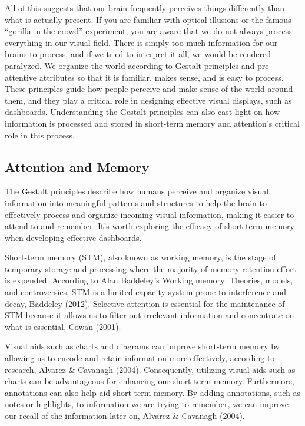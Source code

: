 \documentclass[print]{nuthesis}
\begin{document}
All of this suggests that our brain frequently perceives things differently than what is actually present.
If you are familiar with optical illusions or the famous ``gorilla in the crowd'' experiment, you are aware that we do not always process everything in our visual field.
There is simply too much information for our brains to process, and if we tried to interpret it all, we would be rendered paralyzed.
We organize the world according to Gestalt principles and pre-attentive attributes so that it is familiar, makes sense, and is easy to process.
These principles guide how people perceive and make sense of the world around them, and they play a critical role in designing effective visual displays, such as dashboards.
Understanding the Gestalt principles can also cast light on how information is processed and stored in short-term memory and attention's critical role in this process.

\hypertarget{attention-and-memory}{%
\subsection{Attention and Memory}\label{attention-and-memory}}

The Gestalt principles describe how humans perceive and organize visual information into meaningful patterns and structures to help the brain to effectively process and organize incoming visual information, making it easier to attend to and remember.
It's worth exploring the efficacy of short-term memory when developing effective dashboards.

Short-term memory (STM), also known as working memory, is the stage of temporary storage and processing where the majority of memory retention effort is expended.
According to Alan Baddeley's Working memory: Theories, models, and controversies, STM is a limited-capacity system prone to interference and decay, Baddeley (2012).
Selective attention is essential for the maintenance of STM because it allows us to filter out irrelevant information and concentrate on what is essential, Cowan (2001).

Visual aids such as charts and diagrams can improve short-term memory by allowing us to encode and retain information more effectively, according to research, Alvarez \& Cavanagh (2004).
Consequently, utilizing visual aids such as charts can be advantageous for enhancing our short-term memory.
Furthermore, annotations can also help aid short-term memory.
By adding annotations, such as notes or highlights, to information we are trying to remember, we can improve our recall of the information later on, Alvarez \& Cavanagh (2004).
\end{document}
